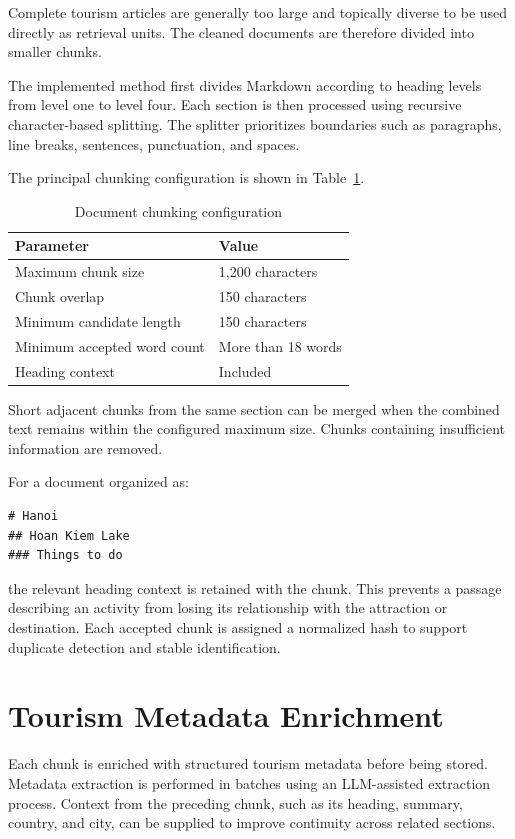 Complete tourism articles are generally too large and topically diverse to be
used directly as retrieval units. The cleaned documents are therefore divided
into smaller chunks.

The implemented method first divides Markdown according to heading levels from
level one to level four. Each section is then processed using recursive
character-based splitting. The splitter prioritizes boundaries such as
paragraphs, line breaks, sentences, punctuation, and spaces.

The principal chunking configuration is shown in
Table~\ref{tab:chunk-configuration}.

\begin{table}[H]
\centering
\caption{Document chunking configuration}
\label{tab:chunk-configuration}
\begin{tabular}{ll}
\hline
\textbf{Parameter} & \textbf{Value} \\
\hline
Maximum chunk size & 1,200 characters \\
Chunk overlap & 150 characters \\
Minimum candidate length & 150 characters \\
Minimum accepted word count & More than 18 words \\
Heading context & Included \\
\hline
\end{tabular}
\end{table}

Short adjacent chunks from the same section can be merged when the combined
text remains within the configured maximum size. Chunks containing insufficient
information are removed.

For a document organized as:

\begin{verbatim}
# Hanoi
## Hoan Kiem Lake
### Things to do
\end{verbatim}

the relevant heading context is retained with the chunk. This prevents a
passage describing an activity from losing its relationship with the
attraction or destination. Each accepted chunk is assigned a normalized hash
to support duplicate detection and stable identification.

\section{Tourism Metadata Enrichment}

Each chunk is enriched with structured tourism metadata before being stored.
Metadata extraction is performed in batches using an LLM-assisted extraction
process. Context from the preceding chunk, such as its heading, summary,
country, and city, can be supplied to improve continuity across related
sections.

